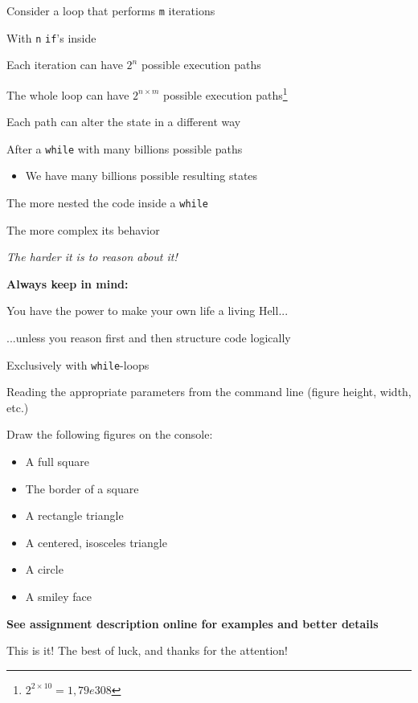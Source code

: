 \documentclass{beamer}
\begin{document}
\begin{slide}{
\item Consider a loop that performs \texttt{m} iterations
\item With \texttt{n} \texttt{if}'s inside
\item Each iteration can have $2^n$ possible execution paths
\item The whole loop can have $2^{n\times m}$ possible execution paths\footnote{$2^{2\times 10} = 1,79e308$}
}\end{slide}

\begin{slide}{
\item Each path can alter the state in a different way
\item After a \texttt{while} with many billions possible paths
\begin{itemize}
\item We have many billions possible resulting states
\end{itemize}
}\end{slide}

\begin{slide}{
\item The more nested the code inside a \texttt{while}
\item The more complex its behavior
\item \textit{The harder it is to reason about it!}
}\end{slide}

\begin{slide}{
\item \textbf{Always keep in mind:}
\item You have the power to make your own life a living Hell...
\pause
\item ...unless you reason first and then structure code logically
}\end{slide}

\begin{slide}{
\item Exclusively with \texttt{while}-loops
\item Reading the appropriate parameters from the command line (figure height, width, etc.)
\item Draw the following figures on the console:
\begin{itemize}
\item A full square 
\item The border of a square
\item A rectangle triangle
\item A centered, isosceles triangle
\item A circle
\item A smiley face
\end{itemize}
\item \textbf{See assignment description online for examples and better details}
}\end{slide}

\begin{frame}{This is it!}
\center
\fontsize{18pt}{7.2}\selectfont
The best of luck, and thanks for the attention!
\end{frame}
\end{document}
